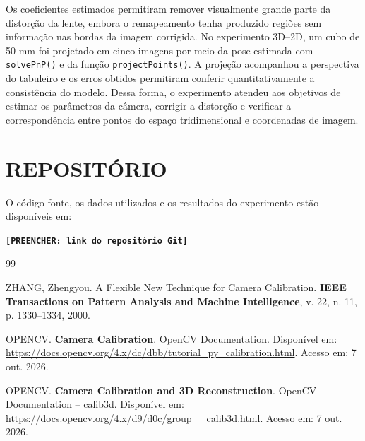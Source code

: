 \documentclass[12pt, a4paper, twoside, chapter=TITLE, subsection=TITLE, section=TITLE, subsubsection=TITLE, subsubsubsection=TITLE, english, german, brazil]{abntex2}
\newcommand{\pendente}[1]{\textbf{[PREENCHER: #1]}}
\begin{document}
Os coeficientes estimados permitiram remover visualmente grande parte da distorção da lente, embora o remapeamento tenha produzido regiões sem informação nas bordas da imagem corrigida. No experimento 3D--2D, um cubo de 50 mm foi projetado em cinco imagens por meio da pose estimada com \texttt{solvePnP()} e da função \texttt{projectPoints()}. A projeção acompanhou a perspectiva do tabuleiro e os erros obtidos permitiram conferir quantitativamente a consistência do modelo. Dessa forma, o experimento atendeu aos objetivos de estimar os parâmetros da câmera, corrigir a distorção e verificar a correspondência entre pontos do espaço tridimensional e coordenadas de imagem.

\chapter{REPOSITÓRIO}
O código-fonte, os dados utilizados e os resultados do experimento estão disponíveis em:

\begin{center}
\texttt{\pendente{link do repositório Git}}
\end{center}

\postextual
\begin{thebibliography}{99}

ZHANG, Zhengyou. A Flexible New Technique for Camera Calibration. \textbf{IEEE Transactions on Pattern Analysis and Machine Intelligence}, v. 22, n. 11, p. 1330--1334, 2000.

OPENCV. \textbf{Camera Calibration}. OpenCV Documentation. Disponível em: \url{https://docs.opencv.org/4.x/dc/dbb/tutorial_py_calibration.html}. Acesso em: 7 out. 2026.

OPENCV. \textbf{Camera Calibration and 3D Reconstruction}. OpenCV Documentation -- calib3d. Disponível em: \url{https://docs.opencv.org/4.x/d9/d0c/group__calib3d.html}. Acesso em: 7 out. 2026.

\end{thebibliography}
\end{document}
